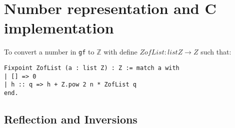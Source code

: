 \section{Number representation and C implementation}

To convert a number in \texttt{gf} to $\mathbb{Z}$ with define $ZofList : list Z \to Z$ such that:
\begin{lstlisting}[language=Coq]
Fixpoint ZofList (a : list Z) : Z := match a with
| [] => 0
| h :: q => h + Z.pow 2 n * ZofList q
end.
\end{lstlisting}

\subsection{Reflection and Inversions}

\begin{lstlisting}

\end{lstlisting}
